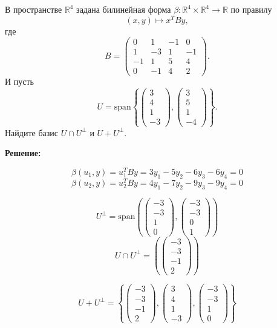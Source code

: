\documentclass[a4paper,12pt]{article}
\begin{document}
В пространстве \( \mathbb{R}^4 \) задана билинейная форма \( \beta: \mathbb{R}^4 \times \mathbb{R}^4 \to \mathbb{R} \) по правилу
\[
(x, y) \mapsto x^T By,
\]
где
\[
B =
\begin{pmatrix}
0 & 1 & -1 & 0 \\
1 & -3 & 1 & -1 \\
-1 & 1 & 5 & 4 \\
0 & -1 & 4 & 2
\end{pmatrix}.
\]
И пусть
\[
U = \text{span} \left\{
\begin{pmatrix}
3 \\
4 \\
1 \\
-3
\end{pmatrix},
\begin{pmatrix}
3 \\
5 \\
1 \\
-4
\end{pmatrix}
\right\}.
\]
Найдите базис \( U \cap U^{\perp} \) и \( U + U^{\perp} \).

\textbf{Решение:}

\[
\beta(u_1, y) = u_1^TBy = 3y_1 -5y_2 -6y_3 -6y_4 = 0 
\]
\[
\beta(u_2, y) = u_2^TBy = 4y_1 -7y_2 -9y_3 -9y_4 = 0
\]


\[
U^{\perp} = \text{span} \left( \begin{pmatrix}
    -3 \\ -3 \\ 1 \\ 0
\end{pmatrix}, \begin{pmatrix}
    -3 \\ -3 \\ 0 \\ 1
\end{pmatrix} \right)
\]
\[
U \cap U^{\perp} = \left( \begin{pmatrix}
    -3 \\ -3 \\ -1 \\ 2
\end{pmatrix} \right)
\]

 \[ U + U^{\perp} =
   \left\{ 
   \begin{pmatrix} -3 \\ -3 \\ -1 \\ 2 \end{pmatrix}, 
   \begin{pmatrix} 3 \\ 4 \\ 1 \\ -3 \end{pmatrix}, 
   \begin{pmatrix} -3 \\ -3 \\ 1 \\ 0 \end{pmatrix} 
   \right\}
   \]
\end{document}
